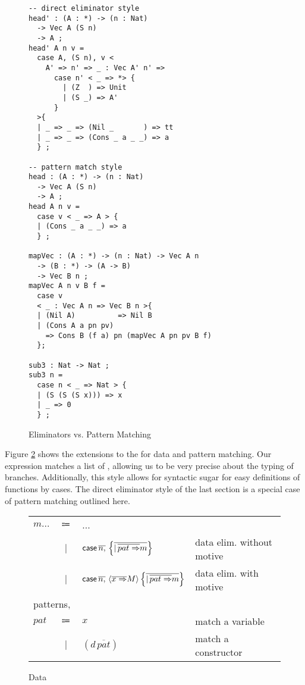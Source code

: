\begin{figure}
\begin{lstlisting}[basicstyle={\ttfamily\small}]
-- direct eliminator style
head' : (A : *) -> (n : Nat)
  -> Vec A (S n) 
  -> A ;
head' A n v =
  case A, (S n), v <
    A' => n' => _ : Vec A' n' =>
      case n' < _ => *> {
        | (Z  ) => Unit
        | (S _) => A'
      }
  >{
  | _ => _ => (Nil _       ) => tt
  | _ => _ => (Cons _ a _ _) => a
  } ;

-- pattern match style
head : (A : *) -> (n : Nat)
  -> Vec A (S n) 
  -> A ;
head A n v =
  case v < _ => A > {
  | (Cons _ a _ _) => a
  } ;

mapVec : (A : *) -> (n : Nat) -> Vec A n 
  -> (B : *) -> (A -> B)
  -> Vec B n ;
mapVec A n v B f =
  case v 
  < _ : Vec A n => Vec B n >{
  | (Nil A)          => Nil B
  | (Cons A a pn pv) 
    => Cons B (f a) pn (mapVec A pn pv B f)
  };

sub3 : Nat -> Nat ;
sub3 n =
  case n < _ => Nat > {
  | (S (S (S x))) => x
  | _ => 0
  } ;
\end{lstlisting}



\caption{Eliminators vs. Pattern Matching}
\label{fig:data-eliminators}
\end{figure}

Figure \ref{fig:surface-data} shows the extensions to the \slang{} for data and pattern matching.
Our \case{} expression matches a list of \scruts{}, allowing us to be very precise about the typing of branches.
Additionally, this style allows for syntactic sugar for easy definitions of functions by cases.
The direct eliminator style \case{} of the last section is a special case of pattern matching outlined here.

\begin{figure}
\begin{tabular}{lcll}
$m...$ & $\Coloneqq$ & ... & \tabularnewline
 & $|$ & $\mathsf{case}{} \,\overline{n,}\,\left\{ \overline{|\,\overline{pat\Rightarrow}m}\right\} $ & data elim. without motive\tabularnewline
 & $|$ & $\mathsf{case}{} \,\overline{n,}\,\left\langle \overline{x\Rightarrow}M\right\rangle \left\{ \overline{|\,\overline{pat\Rightarrow}m}\right\} $ & data elim. with motive\tabularnewline
\multicolumn{4}{l}{patterns,}\tabularnewline
$pat$ & $\Coloneqq$ & $x$ & match a variable\tabularnewline
 & $|$ & $(d\,\overline{pat})$ & match a constructor\tabularnewline
\end{tabular}

\caption{\SLang{} Data}
\label{fig:surface-data}
\end{figure}

